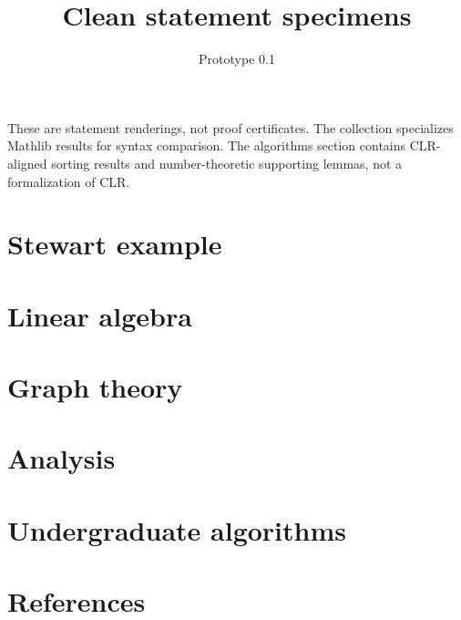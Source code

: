 \documentclass[11pt]{article}
\title{Clean statement specimens}
\author{}
\date{Prototype 0.1}
\begin{document}
\par\medskip
\maketitle
These are statement renderings, not proof certificates. The collection specializes
Mathlib results for syntax comparison. The algorithms section contains CLR-aligned
sorting results and number-theoretic supporting lemmas, not a formalization of CLR.
\tableofcontents
\section{Stewart example}
\clearpage\section{Linear algebra}
\clearpage\section{Graph theory}
\clearpage\section{Analysis}
\clearpage\section{Undergraduate algorithms}
\clearpage\section{References}

\end{document}
